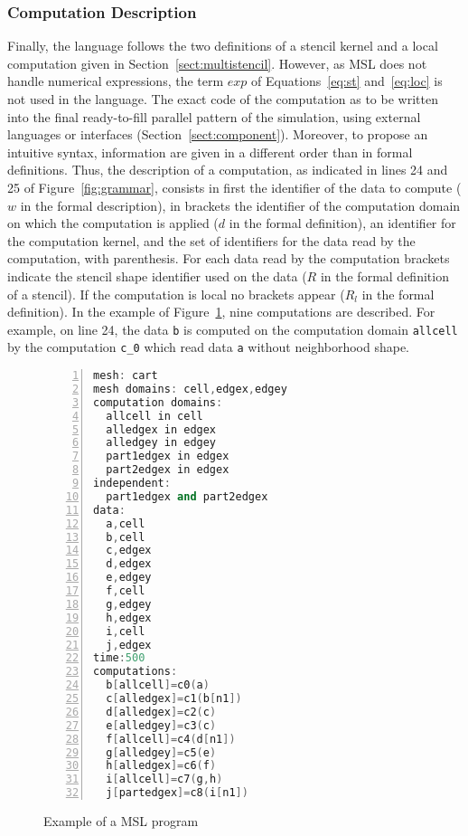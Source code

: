 \subsubsection*{Computation Description}
Finally, the language follows the two definitions of a stencil kernel and a local computation given in Section~\ref{sect:multistencil}. However, as MSL does not handle numerical expressions, the term $exp$ of Equations~\ref{eq:st} and~\ref{eq:loc} is not used in the language. The exact code of the computation as to be written into the final ready-to-fill parallel pattern of the simulation, using external languages or interfaces (\cf Section~\ref{sect:component}). Moreover, to propose an intuitive syntax, information are given in a different order than in formal definitions.
Thus, the description of a computation, as indicated in lines 24 and 25 of Figure~\ref{fig:grammar}, consists in first the identifier of the data to compute ($w$ in the formal description), in brackets the identifier of the computation domain on which the computation is applied ($d$ in the formal definition), an identifier for the computation kernel, and the set of identifiers for the data read by the computation, with parenthesis. For each data read by the computation brackets indicate the stencil shape identifier used on the data ($R$ in the formal definition of a stencil). If the computation is local no brackets appear ($R_l$ in the formal definition). In the example of Figure~\ref{fig:mslex}, nine computations are described. For example, on line 24, the data \texttt{b} is computed on the computation domain \texttt{allcell} by the computation \texttt{c\_0} which read data \texttt{a} without neighborhood shape.

\begin{figure}[t]
\begin{lstlisting}[basicstyle=\small,mathescape,frame=single,language=C++,numbers=left]
mesh: cart
mesh domains: cell,edgex,edgey
computation domains:
  allcell in cell
  alledgex in edgex
  alledgey in edgey
  part1edgex in edgex
  part2edgex in edgex
independent:
  part1edgex and part2edgex
data:
  a,cell
  b,cell
  c,edgex
  d,edgex
  e,edgey
  f,cell
  g,edgey
  h,edgex
  i,cell
  j,edgex
time:500
computations:
  b[allcell]=c0(a)
  c[alledgex]=c1(b[n1])
  d[alledgex]=c2(c)
  e[alledgey]=c3(c)
  f[allcell]=c4(d[n1])
  g[alledgey]=c5(e)
  h[alledgex]=c6(f)
  i[allcell]=c7(g,h)
  j[partedgex]=c8(i[n1])
\end{lstlisting}
\caption{Example of a MSL program}
\label{fig:mslex}
\end{figure}

